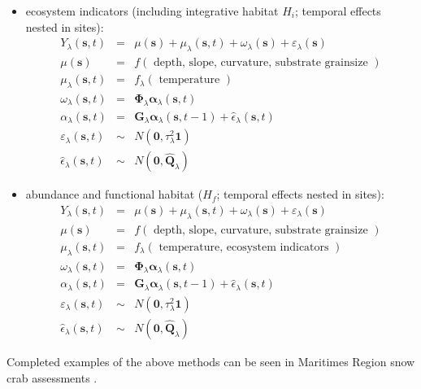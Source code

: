 \documentclass[letterpaper,portrait,11pt]{scrartcl}
\numberwithin{equation}{section}    %
\numberwithin{figure}{section}    %
\numberwithin{table}{section}       %
\begin{document}
\begin{itemize}
\item ecosystem indicators (including integrative habitat $H_i$; temporal effects nested in sites): 
  \begin{eqnarray*}
  Y_\lambda(\bm{s},t) &=& \mu(\bm{s}) + \mu_\lambda(\bm{s},t) + \omega_\lambda(\bm{s}) + \varepsilon_\lambda(\bm{s}) \\
  \mu(\bm{s}) &=& f ( \text{ depth, slope, curvature, substrate grainsize } ) \\
  \mu_\lambda(\bm{s},t) &=& f_\lambda ( \text{ temperature } ) \\
  \omega_\lambda(\bm{s},t) &=& \bm{\Phi}_\lambda \bm{\alpha}_\lambda (\bm{s},t)  \\
  \alpha_\lambda(\bm{s},t) &=& \bm{G}_\lambda \bm{\alpha}_\lambda (\bm{s},t-1) + \hat{\epsilon}_\lambda(\bm{s},t)  \\
  \varepsilon_\lambda(\bm{s},t) &\sim& N(\bm{0}, \tau_\lambda^2 \bm{1} )  \\
  \hat{\epsilon}_\lambda(\bm{s},t) &\sim& N(\bm{0}, \bm{\hat{Q}}_\lambda)  
\end{eqnarray*}

\item abundance and functional habitat ($H_f$; temporal effects nested in sites): 
  \begin{eqnarray*}
  Y_\lambda(\bm{s},t) &=& \mu(\bm{s}) + \mu_\lambda(\bm{s},t) + \omega_\lambda(\bm{s}) + \varepsilon_\lambda(\bm{s}) \\
  \mu(\bm{s}) &=& f ( \text{ depth, slope, curvature, substrate grainsize } ) \\
  \mu_\lambda(\bm{s},t) &=& f_\lambda ( \text{ temperature, ecosystem indicators } ) \\
  \omega_\lambda(\bm{s},t) &=& \bm{\Phi}_\lambda \bm{\alpha}_\lambda (\bm{s},t)  \\
  \alpha_\lambda (\bm{s},t) &=& \bm{G}_\lambda \bm{\alpha}_\lambda (\bm{s},t-1) + \hat{\epsilon}_\lambda(\bm{s},t)  \\
  \varepsilon_\lambda(\bm{s},t) &\sim& N(\bm{0}, \tau_\lambda^2 \bm{1} )  \\
  \hat{\epsilon}_\lambda(\bm{s},t) &\sim& N(\bm{0}, \bm{\hat{Q}}_\lambda) 
\end{eqnarray*}

\end{itemize}

Completed examples of the above methods can be seen in Maritimes Region snow crab assessments \parencite{ref:snowcrabAssessment2016}.
\end{document}
